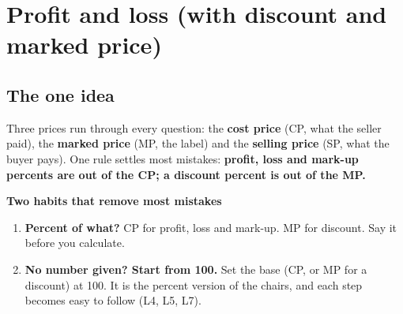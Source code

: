 \documentclass[11pt,a4paper]{article}
\let\oldsubsection\subsection
\renewcommand{\subsection}{\needspace{9\baselineskip}\oldsubsection}
\newcommand{\infobox}[2]{\par\medskip\noindent\begingroup\setlength{\fboxsep}{7pt}%
  \colorbox{codebg}{\parbox{\dimexpr\linewidth-14pt\relax}{\textbf{\color{ember}#1}\par\smallskip #2}}\endgroup\par\medskip}
\begin{document}
\clearpage
\section[Profit and loss (L1--L12)]{Profit and loss (with discount and marked price)}\label{ch:L}

\subsection*{The one idea}
Three prices run through every question: the \textbf{cost price} (CP, what the seller paid), the \textbf{marked price} (MP, the label) and the \textbf{selling price} (SP, what the buyer pays). One rule settles most mistakes: \textbf{profit, loss and mark-up percents are out of the CP; a discount percent is out of the MP.}

\begin{center}
\end{center}

\infobox{Two habits that remove most mistakes}{
\begin{enumerate}
\item \textbf{Percent of what?} CP for profit, loss and mark-up. MP for discount. Say it before you calculate.
\item \textbf{No number given? Start from 100.} Set the base (CP, or MP for a discount) at 100. It is the percent version of the chairs, and each step becomes easy to follow (L4, L5, L7).
\end{enumerate}}
\end{document}
